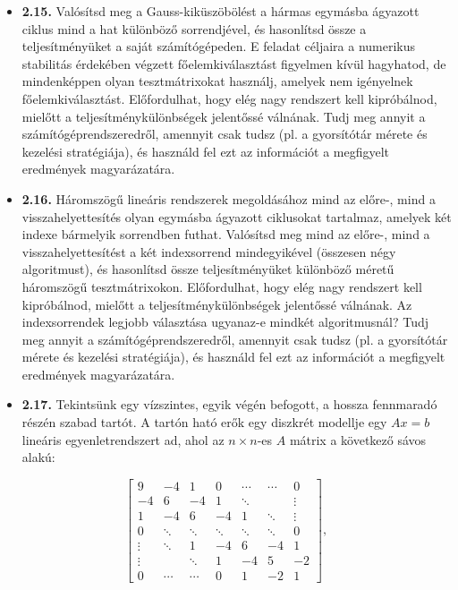\documentclass[
  magyar,
  11pt]{article}
\providecommand{\tightlist}{%
  \setlength{\itemsep}{0pt}\setlength{\parskip}{0pt}}
\begin{document}
\begin{itemize}
\tightlist
\item
  \textbf{2.15.} Valósítsd meg a Gauss-kiküszöbölést a hármas egymásba
  ágyazott ciklus mind a hat különböző sorrendjével, és hasonlítsd össze
  a teljesítményüket a saját számítógépeden. E feladat céljaira a
  numerikus stabilitás érdekében végzett főelemkiválasztást figyelmen
  kívül hagyhatod, de mindenképpen olyan tesztmátrixokat használj,
  amelyek nem igényelnek főelemkiválasztást. Előfordulhat, hogy elég
  nagy rendszert kell kipróbálnod, mielőtt a teljesítménykülönbségek
  jelentőssé válnának. Tudj meg annyit a számítógéprendszeredről,
  amennyit csak tudsz (pl. a gyorsítótár mérete és kezelési
  stratégiája), és használd fel ezt az információt a megfigyelt
  eredmények magyarázatára.
\item
  \textbf{2.16.} Háromszögű lineáris rendszerek megoldásához mind az
  előre-, mind a visszahelyettesítés olyan egymásba ágyazott ciklusokat
  tartalmaz, amelyek két indexe bármelyik sorrendben futhat. Valósítsd
  meg mind az előre-, mind a visszahelyettesítést a két indexsorrend
  mindegyikével (összesen négy algoritmust), és hasonlítsd össze
  teljesítményüket különböző méretű háromszögű tesztmátrixokon.
  Előfordulhat, hogy elég nagy rendszert kell kipróbálnod, mielőtt a
  teljesítménykülönbségek jelentőssé válnának. Az indexsorrendek legjobb
  választása ugyanaz-e mindkét algoritmusnál? Tudj meg annyit a
  számítógéprendszeredről, amennyit csak tudsz (pl. a gyorsítótár mérete
  és kezelési stratégiája), és használd fel ezt az információt a
  megfigyelt eredmények magyarázatára.
\item
  \textbf{2.17.} Tekintsünk egy vízszintes, egyik végén befogott, a
  hossza fennmaradó részén szabad tartót. A tartón ható erők egy
  diszkrét modellje egy \(Ax = b\) lineáris egyenletrendszert ad, ahol
  az \(n \times n\)-es \(A\) mátrix a következő sávos alakú:
\end{itemize}

\[\begin{bmatrix} 9 & -4 & 1 & 0 & \cdots & \cdots & 0 \\ -4 & 6 & -4 & 1 & \ddots & & \vdots \\ 1 & -4 & 6 & -4 & 1 & \ddots & \vdots \\ 0 & \ddots & \ddots & \ddots & \ddots & \ddots & 0 \\ \vdots & \ddots & 1 & -4 & 6 & -4 & 1 \\ \vdots & & \ddots & 1 & -4 & 5 & -2 \\ 0 & \cdots & \cdots & 0 & 1 & -2 & 1 \end{bmatrix},\]
\end{document}
